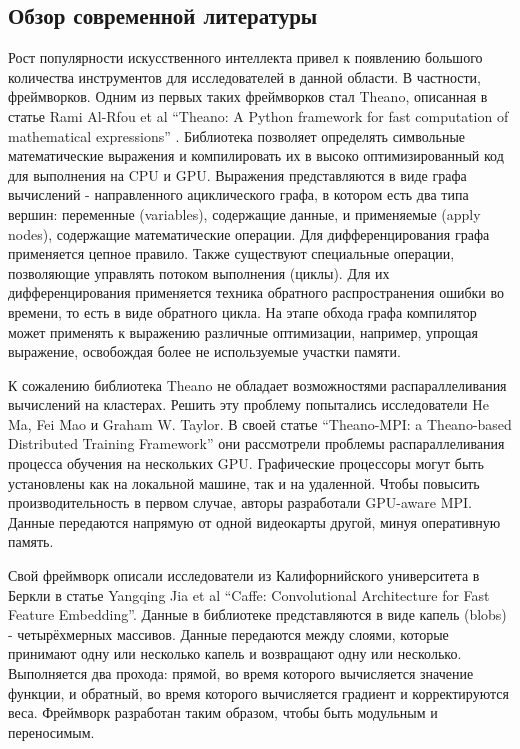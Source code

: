 \subsection{Обзор современной литературы}
	Рост популярности искусственного интеллекта привел к появлению большого количества инструментов для исследователей в данной области. В частности, фреймворков. Одним из первых таких фреймворков стал Theano, описанная в статье Rami Al-Rfou et al “Theano: A Python framework for fast computation of mathematical expressions”\cite{theano} . Библиотека позволяет определять символьные математические выражения и компилировать их в высоко оптимизированный код для выполнения на CPU и GPU. Выражения представляются в виде графа вычислений - направленного ациклического графа, в котором есть два типа вершин: переменные (variables), содержащие данные, и применяемые (apply nodes), содержащие математические операции. Для дифференцирования графа применяется цепное правило. Также существуют специальные операции, позволяющие управлять потоком выполнения (циклы). Для их дифференцирования применяется техника обратного распространения ошибки во времени, то есть в виде обратного цикла. На этапе обхода графа компилятор может применять к выражению различные оптимизации, например, упрощая выражение, освобождая более не используемые участки памяти.
\par
К сожалению библиотека Theano не обладает возможностями распараллеливания вычислений на кластерах. Решить эту проблему попытались исследователи He Ma, Fei Mao и Graham W. Taylor. В своей статье “Theano-MPI: a Theano-based Distributed Training Framework”\cite{theanompi} они рассмотрели проблемы распараллеливания процесса обучения на нескольких GPU. Графические процессоры могут быть установлены как на локальной машине, так и на удаленной. Чтобы повысить производительность в первом случае, авторы разработали GPU-aware MPI. Данные передаются напрямую от одной видеокарты другой, минуя оперативную память.
\par
Свой фреймворк описали исследователи из Калифорнийского университета в Беркли в статье Yangqing Jia et al “Caffe: Convolutional Architecture for Fast Feature Embedding”\cite{caffe}. Данные в библиотеке представляются в виде капель (blobs) - четырёхмерных массивов. Данные передаются между слоями, которые принимают одну или несколько капель и возвращают одну или несколько. Выполняется два прохода: прямой, во время которого вычисляется значение функции, и обратный, во время которого вычисляется градиент и корректируются веса. Фреймворк разработан таким образом, чтобы быть модульным и переносимым.
